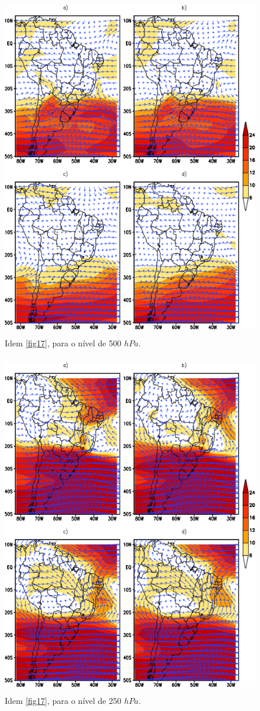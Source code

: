 \begin{figure}[!hbp]
\centering
\includegraphics[height=15cm]{./figs/media_ventos_anl_500hPa.png}
\caption{Idem \autoref{fig17}, para o nível de 500 $hPa$.}
\label{fig18}
\end{figure}

\begin{figure}[!hbp]
\centering
\includegraphics[height=15cm]{./figs/media_ventos_anl_250hPa.png}
\caption{Idem \autoref{fig17}, para o nível de 250 $hPa$.}
\label{fig19}
\end{figure}

